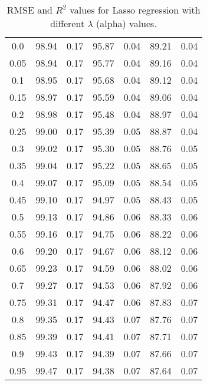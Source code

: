 \documentclass[10pt,letterpaper]{article}
\begin{document}
\begin{itemize}
\begin{table}[H]
\begin{tabular}{ccccccc}
        \midrule
        0.0  & 98.94  & 0.17  & 95.87 & 0.04 & 89.21 & 0.04 \\
        0.05 & 98.94  & 0.17  & 95.77 & 0.04 & 89.16 & 0.04 \\
        0.1  & 98.95  & 0.17  & 95.68 & 0.04 & 89.12 & 0.04 \\
        0.15 & 98.97  & 0.17  & 95.59 & 0.04 & 89.06 & 0.04 \\
        0.2  & 98.98  & 0.17  & 95.48 & 0.04 & 88.97 & 0.04 \\
        0.25 & 99.00  & 0.17  & 95.39 & 0.05 & 88.87 & 0.04 \\
        0.3  & 99.02  & 0.17  & 95.30 & 0.05 & 88.76 & 0.05 \\
        0.35 & 99.04  & 0.17  & 95.22 & 0.05 & 88.65 & 0.05 \\
        0.4  & 99.07  & 0.17  & 95.09 & 0.05 & 88.54 & 0.05 \\
        0.45 & 99.10  & 0.17  & 94.97 & 0.05 & 88.43 & 0.05 \\
        0.5  & 99.13  & 0.17  & 94.86 & 0.06 & 88.33 & 0.06 \\
        0.55 & 99.16  & 0.17  & 94.75 & 0.06 & 88.22 & 0.06 \\
        0.6  & 99.20  & 0.17  & 94.67 & 0.06 & 88.12 & 0.06 \\
        0.65 & 99.23  & 0.17  & 94.59 & 0.06 & 88.02 & 0.06 \\
        0.7  & 99.27  & 0.17  & 94.53 & 0.06 & 87.92 & 0.06 \\
        0.75 & 99.31  & 0.17  & 94.47 & 0.06 & 87.83 & 0.07 \\
        0.8  & 99.35  & 0.17  & 94.43 & 0.07 & 87.76 & 0.07 \\
        0.85 & 99.39  & 0.17  & 94.41 & 0.07 & 87.71 & 0.07 \\
        0.9  & 99.43  & 0.17  & 94.39 & 0.07 & 87.66 & 0.07 \\
        0.95 & 99.47  & 0.17  & 94.38 & 0.07 & 87.64 & 0.07 \\
        \bottomrule
        \end{tabular}
        \caption{RMSE and \(R^2\) values for Lasso regression with different \(\lambda\) (alpha) values.}
        \label{tab:lasso_results}
        \end{table}
        

\end{itemize}
\end{document}
